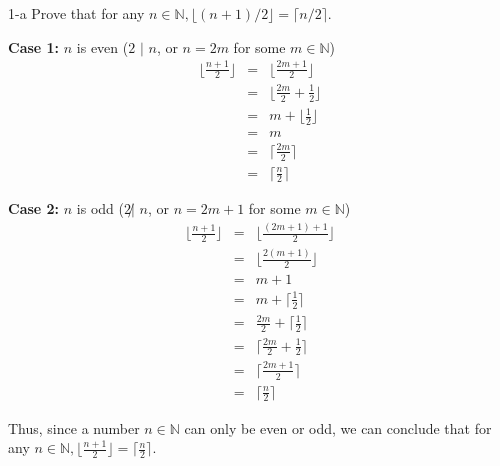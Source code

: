 \documentclass[11pt]{article}
\begin{document}
\begin{prob}{1-a}
Prove that for any $n \in \mathbb{N}, \lfloor(n+1)/2\rfloor = \lceil n/2 \rceil$.
\end{prob}
\begin{sol}

\textbf{Case 1:} $n$ is even ($2$ $|$ $n$, or $n = 2m$ for some $m \in \mathbb{N}$) 
\begin{eqnarray*}
\Big\lfloor\frac{n+1}{2}\Big\rfloor & = & \Big\lfloor\frac{2m + 1}{2}\Big\rfloor \\
& = & \Big\lfloor\frac{2m}{2}  + \frac{1}{2}\Big\rfloor\\
& = & m + \Big\lfloor\frac{1}{2}\Big\rfloor \\
& = & m \\
& = & \Big\lceil\frac{2m}{2}\Big\rceil \\
& = & \Big\lceil\frac{n}{2}\Big\rceil
\end{eqnarray*}

\textbf{Case 2:} $n$ is odd ($2 \not|$  $n$, or $n = 2m + 1$ for some $m \in \mathbb{N}$) 
\begin{eqnarray*}
\Big\lfloor\frac{n+1}{2}\Big\rfloor & = & \Big\lfloor\frac{(2m + 1) +1}{2}\Big\rfloor \\
& = & \Big\lfloor\frac{2(m + 1)}{2}\Big\rfloor \\
& = & m + 1 \\
& = & m + \Big\lceil\frac{1}{2}\Big\rceil \\
& = & \frac{2m}{2} + \Big\lceil\frac{1}{2}\Big\rceil \\
& = & \Big\lceil\frac{2m}{2} + \frac{1}{2}\Big\rceil \\
& = & \Big\lceil\frac{2m + 1}{2}\Big\rceil  \\
& = & \Big\lceil\frac{n}{2}\Big\rceil
\end{eqnarray*}

Thus, since a number $n \in \mathbb{N}$ can only be even or odd, we can conclude that for any $n \in \mathbb{N}, \Big\lfloor\frac{n+1}{2}\Big\rfloor = \Big\lceil\frac{n}{2}\Big\rceil$.
\end{sol}
\end{document}
